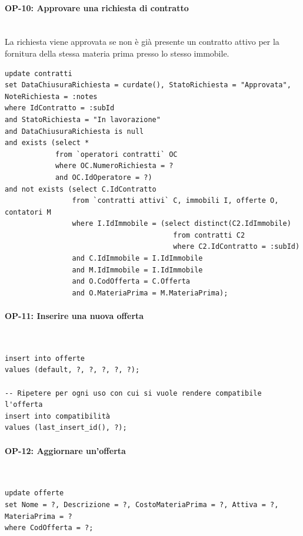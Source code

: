 \documentclass[a4paper,12pt]{report}
\begin{document}
\paragraph{OP-10: Approvare una richiesta di contratto}\mbox{}\\
La richiesta viene approvata se non è già presente un contratto attivo per la fornitura della stessa materia prima presso lo stesso immobile.
\begin{lstlisting}
update contratti
set DataChiusuraRichiesta = curdate(), StatoRichiesta = "Approvata", NoteRichiesta = :notes
where IdContratto = :subId
and StatoRichiesta = "In lavorazione"
and DataChiusuraRichiesta is null
and exists (select *
            from `operatori contratti` OC
            where OC.NumeroRichiesta = ?
            and OC.IdOperatore = ?)
and not exists (select C.IdContratto
                from `contratti attivi` C, immobili I, offerte O, contatori M
                where I.IdImmobile = (select distinct(C2.IdImmobile)
                                        from contratti C2
                                        where C2.IdContratto = :subId)
                and C.IdImmobile = I.IdImmobile
                and M.IdImmobile = I.IdImmobile
                and O.CodOfferta = C.Offerta
                and O.MateriaPrima = M.MateriaPrima);
\end{lstlisting}

\paragraph{OP-11: Inserire una nuova offerta}\mbox{}\\
\begin{lstlisting}
insert into offerte
values (default, ?, ?, ?, ?, ?);

-- Ripetere per ogni uso con cui si vuole rendere compatibile l'offerta
insert into compatibilità
values (last_insert_id(), ?);
\end{lstlisting}
    
\paragraph{OP-12: Aggiornare un'offerta}\mbox{}\\
\begin{lstlisting}
update offerte
set Nome = ?, Descrizione = ?, CostoMateriaPrima = ?, Attiva = ?, MateriaPrima = ?
where CodOfferta = ?;
\end{lstlisting}
\end{document}
